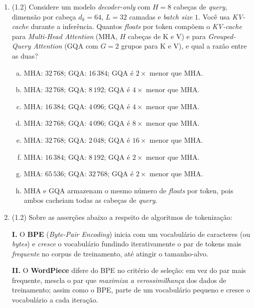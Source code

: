 \documentclass[11pt,a4paper]{article}
\begin{document}
\begin{enumerate}[1)]

\item (1.2) Considere um modelo \textit{decoder-only} com $H = 8$ cabeças de \textit{query}, dimensão por cabeça $d_k = 64$, $L = 32$ camadas e \textit{batch size} $1$. Você usa \textit{KV-cache} durante a inferência. Quantos \textit{floats} por token compõem o \textit{KV-cache} para \textit{Multi-Head Attention} (MHA, $H$ cabeças de K e V) e para \textit{Grouped-Query Attention} (GQA com $G = 2$ grupos para K e V), e qual a razão entre as duas?
\begin{enumerate}[a)]
    \item MHA: $32\,768$; GQA: $16\,384$; GQA é $2\times$ menor que MHA.
    \item MHA: $32\,768$; GQA: $8\,192$; GQA é $4\times$ menor que MHA.
    \item MHA: $16\,384$; GQA: $4\,096$; GQA é $4\times$ menor que MHA.
    \item MHA: $32\,768$; GQA: $4\,096$; GQA é $8\times$ menor que MHA.
    \item MHA: $32\,768$; GQA: $2\,048$; GQA é $16\times$ menor que MHA.
    \item MHA: $16\,384$; GQA: $8\,192$; GQA é $2\times$ menor que MHA.
    \item MHA: $65\,536$; GQA: $32\,768$; GQA é $2\times$ menor que MHA.
    \item MHA e GQA armazenam o mesmo número de \textit{floats} por token, pois ambos cacheiam todas as cabeças de \textit{query}.
\end{enumerate}

\pagebreak

\item (1.2) Sobre as asserções abaixo a respeito de algoritmos de tokenização:

\textbf{I.} O \textbf{BPE} (\textit{Byte-Pair Encoding}) inicia com um vocabulário de caracteres (ou \textit{bytes}) e \emph{cresce} o vocabulário fundindo iterativamente o par de tokens mais \emph{frequente} no corpus de treinamento, até atingir o tamanho-alvo.

\textbf{II.} O \textbf{WordPiece} difere do BPE no critério de seleção: em vez do par mais frequente, mescla o par que \emph{maximiza a verossimilhança} dos dados de treinamento; assim como o BPE, parte de um vocabulário pequeno e cresce o vocabulário a cada iteração.


\end{enumerate}
\end{document}
